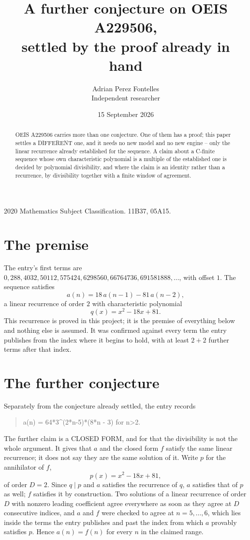 \documentclass[11pt,a4paper]{article}
\title{A further conjecture on OEIS A229506,\\ \large settled by the proof already in hand}
\author{Adrian Perez Fontelles\\ \small Independent researcher}
\date{15 September 2026}
\theoremstyle{plain}
\theoremstyle{definition}
\begin{document}
\maketitle

\begin{abstract}
OEIS A229506 carries more than one conjecture. One of them has a proof; this paper settles a
DIFFERENT one, and it needs no new model and no new engine -- only the linear recurrence already
established for the sequence. A claim about a C-finite sequence whose own characteristic
polynomial is a multiple of the established one is decided by polynomial divisibility, and where
the claim is an identity rather than a recurrence, by divisibility together with a finite window
of agreement.
\end{abstract}

\noindent\small 2020 Mathematics Subject Classification. 11B37, 05A15.\normalsize

\section{The premise}

The entry's first terms are $0, 288, 4032, 50112, 575424, 6298560, 66764736, 691581888,\dots$, with offset $1$. The sequence satisfies
\[
  a(n)=18\,a(n-1) - 81\,a(n-2) ,
\]
a linear recurrence of order $2$ with characteristic polynomial
\[
  q(x)=x^{2} - 18 x + 81 .
\]
This recurrence is proved in this project; it is the premise of everything below and nothing else is assumed.
It was confirmed against every term the entry publishes from the index where it begins to hold,
with at least $2+2$ further terms after that index.

\section{The further conjecture}

Separately from the conjecture already settled, the entry records

\begin{quote}\raggedright a(n) = 64*3\^{}(2*n-5)*(8*n - 3) for n>2.\end{quote}

The further claim is a CLOSED FORM, and for that the divisibility is not the whole argument. It
gives that $a$ and the closed form $f$ satisfy the same linear recurrence; it does not say they
are the same solution of it. Write $p$ for the annihilator of $f$,
\[
  p(x)=x^{2} - 18 x + 81 ,
\]
of order $D=2$. Since $q\mid p$ and $a$ satisfies the recurrence of $q$, $a$ satisfies that of
$p$ as well; $f$ satisfies it by construction. Two solutions of a linear recurrence of order $D$
with nonzero leading coefficient agree everywhere as soon as they agree at $D$ consecutive
indices, and $a$ and $f$ were checked to agree at $n=5,\dots,6$,
which lies inside the terms the entry publishes and past the index from which $a$ provably
satisfies $p$. Hence $a(n)=f(n)$ for every $n$ in the claimed range.
\end{document}

